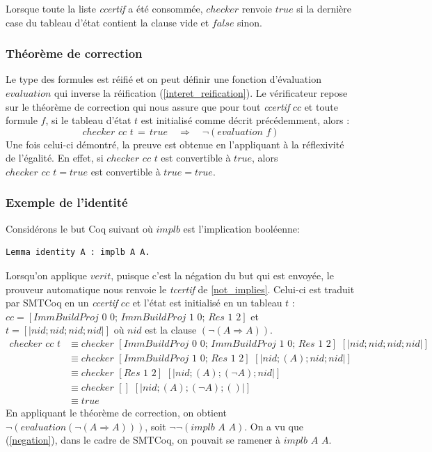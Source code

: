 \documentclass[11pt]{article}
\begin{document}
Lorsque toute la liste \textit{ccertif} a été consommée, $checker$ renvoie $true$ si la dernière case du tableau d'état contient la clause vide et $false$ sinon.

\subsubsection{Théorème de correction}

Le type des formules est réifié et on peut définir une fonction d'évaluation $evaluation$ qui inverse la réification (\ref{interet_reification}). Le vérificateur repose sur le théorème de correction qui nous assure que pour tout \textit{ccertif} $cc$ et toute formule $f$, si le tableau d'état $t$ est initialisé comme décrit précédemment, alors : 
\[ checker  \,\, cc \,\, t \, = \, true \quad \Rightarrow \quad \neg (evaluation \, \, f) \]
Une fois celui-ci démontré, la preuve est obtenue en l'appliquant à la réflexivité de l'égalité. En effet, si $checker  \,\, cc\,\, t  $ est convertible à $true$, alors $checker  \,\, cc\,\, t = true $ est convertible à $true = true$.

\subsubsection{Exemple de l'identité}

Considérons le but Coq suivant où $implb$ est l'implication booléenne:
\begin{lstlisting}[frame=single]
  Lemma identity A : implb A A.
\end{lstlisting}  
Lorsqu'on applique $verit$, puisque c'est la négation du but qui est envoyée, le prouveur automatique nous renvoie le \textit{tcertif} de \ref{not_implies}. Celui-ci est traduit par SMTCoq en un \textit{ccertif} $cc$ et l'état est initialisé en un tableau $t$ : 
$cc = [ImmBuildProj \,\, 0 \,\, 0; \,ImmBuildProj \,\, 1 \,\, 0; \, Res \,\, 1 \,\, 2] $ et $t = [|nid; nid; nid; nid|]$ où $nid$ est la clause $( \neg (A \Rightarrow A))$.
\begin{align*}
    checker \,\, cc \,\, t &\equiv checker \,\, [ImmBuildProj \,\, 0 \,\, 0; \,ImmBuildProj \,\, 1 \,\, 0; \, Res \,\, 1 \,\, 2] \,\, [| nid; nid; nid; nid|] \\
    &\equiv checker \,\, [ImmBuildProj \,\, 1 \,\, 0; \, Res \,\, 1 \,\, 2] \,\, [| nid; (A); nid; nid|] \\
    &\equiv checker \,\, [Res \,\, 1 \,\, 2] \,\, [| nid; (A); (\neg A); nid|] \\
    &\equiv checker \,\, [] \,\, [| nid; (A); (\neg A); ()|] \\
    &\equiv true
\end{align*}
En appliquant le théorème de correction, on obtient $\neg (evaluation (\neg (A \Rightarrow A)))$, soit $\neg \neg (implb\,\, A \,\,A)$. On a vu que (\ref{negation}), dans le cadre de SMTCoq, on pouvait se ramener à $implb \,\, A \,\, A$.
\end{document}
